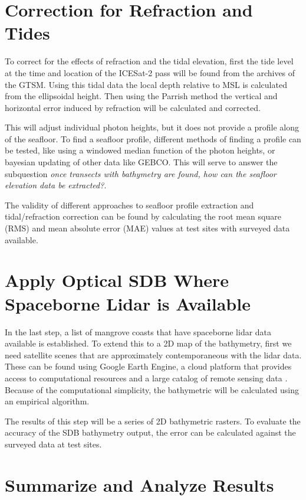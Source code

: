 \section{Correction for Refraction and Tides}

To correct for the effects of refraction and the tidal elevation, first the tide level at the time and location of the ICESat-2 pass will be found from the archives of the GTSM.  Using this tidal data the local depth relative to MSL is calculated from the ellipsoidal height. Then using the Parrish method the vertical and horizontal error induced by refraction will be calculated and corrected.

This will adjust individual photon heights, but it does not provide a profile along of the seafloor. To find a seafloor profile, different methods of finding a profile can be tested, like using a windowed median function of the photon heights, or bayesian updating of other data like GEBCO. This will serve to answer the subquestion \emph{once transects with bathymetry are found, how can the seafloor elevation data be extracted?}.

The validity of different approaches to seafloor profile extraction and tidal/refraction correction can be found by calculating the root mean square (RMS) and mean absolute error (MAE) values at test sites with surveyed data available.

\section{Apply Optical SDB Where Spaceborne Lidar is Available}

In the last step, a list of mangrove coasts that have spaceborne lidar data available is established. To extend this to a 2D map of the bathymetry, first we need satellite scenes that are approximately contemporaneous with the lidar data. These can be found using Google Earth Engine, a cloud platform that provides access to computational resources and a large catalog of remote sensing data \parencite{Gorelick2017a}. Because of the computational simplicity, the bathymetric will be calculated using an empirical algorithm.

The results of this step will be a series of 2D bathymetric rasters. To evaluate the accuracy of the SDB bathymetry output, the error can be calculated against the surveyed data at test sites. 

\section{Summarize and Analyze Results}

